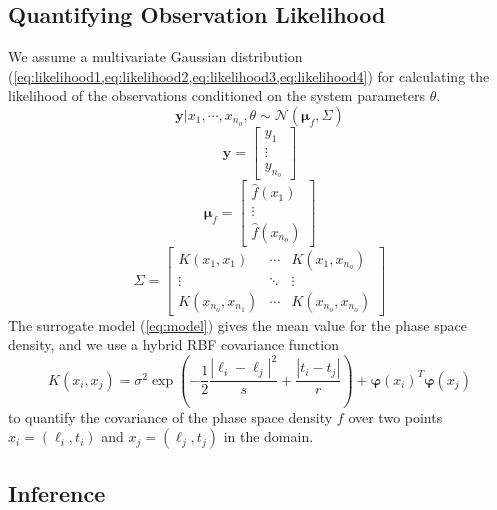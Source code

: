 \subsection{Quantifying Observation Likelihood}

We assume a multivariate Gaussian distribution 
(\cref{eq:likelihood1,eq:likelihood2,eq:likelihood3,eq:likelihood4}) for calculating the 
likelihood of the observations conditioned on the system parameters $\theta$.  
%
\begin{equation}\label{eq:likelihood1}
\mathbf{y} | x_1, \cdots, x_{n_o}, \theta \sim \mathcal{N} \left(\mathbf{\mu}_f, \Sigma \right )
\end{equation}
%
\begin{equation}\label{eq:likelihood2}
\mathbf{y} = \begin{bmatrix}
y_1\\ 
\vdots\\ 
y_{n_o}
\end{bmatrix}
\end{equation}
%
\begin{equation}\label{eq:likelihood3}
  \mathbf{\mu}_f = \begin{bmatrix}
\hat{f}(x_1)\\ 
\vdots\\ 
\hat{f}(x_{n_o})
\end{bmatrix}
\end{equation}
%
\begin{equation}\label{eq:likelihood4}
    \Sigma = \begin{bmatrix}
K(x_1, x_1) & \cdots  & K(x_1, x_{n_o})\\ 
\vdots & \ddots & \vdots\\ 
K(x_{n_o}, x_{n_{1}}) & \cdots  & K(x_{n_o}, x_{n_{o}})
\end{bmatrix}
\end{equation}
%
The surrogate model (\cref{eq:model}) gives the mean value for the phase space density, and we use 
a hybrid RBF covariance function 
\[
  K(x_{i}, x_{j}) = \sigma^2 \exp \left(
    -\frac{1}{2} \frac{|\ell_i - \ell_j|^2}{s} + \frac{|t_i - t_j|}{r}
  \right)  + \mathbf{\varphi}(x_i)^{T}\mathbf{\varphi}(x_j)
\] 
to quantify the covariance of the phase space density $f$ over two points $x_i = (\ell_i, t_i)$ and 
$x_j = (\ell_j, t_j)$ in the domain.

\subsection{Inference}


